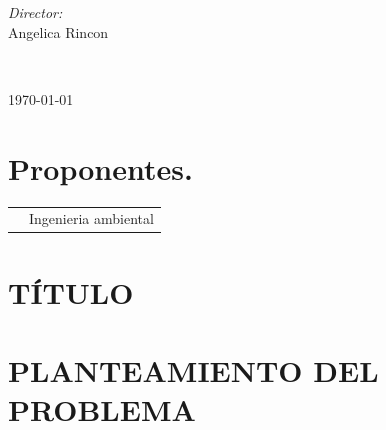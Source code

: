 \documentclass[10pt]{article}
\begin{document}
\begin{center}
\begin{minipage}{0.46\textwidth}
\begin{flushleft}
\end{flushleft}																		%
\end{minipage}		
\begin{minipage}{0.52\textwidth}		
\vspace{-0.6cm}											%
\begin{flushright} \large															%
\emph{Director:} \\																	%
Angelica Rincon\\
\end{flushright}																	%
\end{minipage}	
\vspace*{5cm}
 	
 		\\																		%
\vspace{8cm} 																				
\begin{center}																					
{\large \today}																	%
 			\end{center}												  						
\end{center}							 											
																					
\newpage																		

\tableofcontents 

\newpage

\section{Proponentes.}


\begin{tabular}{cc}
& \parbox[t]{20cm}{Ingenieria ambiental}\\
Angelica Rincon & \parbox[t]{20cm}{Director }
\end{tabular}




\section{TÍTULO} 


\section{PLANTEAMIENTO DEL PROBLEMA}
\end{document}
